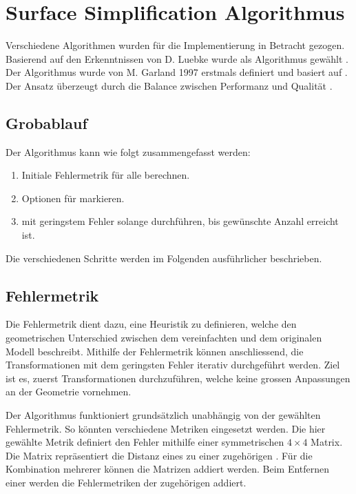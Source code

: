 \section{Surface Simplification Algorithmus}
\label{chap:surfaceSimplificationAlgorithm}
Verschiedene Algorithmen wurden für die Implementierung in Betracht gezogen. Basierend auf den Erkenntnissen von D. Luebke wurde als Algorithmus  gewählt \cite{luebkeAlgorithmComparison}. Der Algorithmus wurde von M. Garland 1997 erstmals definiert und basiert auf . Der Ansatz überzeugt durch die Balance zwischen Performanz und Qualität \cite{surfaceSimplificationUsingQuadricErrorMetrices}\cite{surfaceSimplificationWithColorUsingQuadricErrorMetrices}.

\pagebreak

\subsection{Grobablauf}
Der Algorithmus kann wie folgt zusammengefasst werden:

\begin{enumerate}
  \item Initiale Fehlermetrik für alle  berechnen.
  \item Optionen für  markieren.
  \item {} mit geringstem Fehler solange durchführen, bis gewünschte Anzahl  erreicht ist.
\end{enumerate}

Die verschiedenen Schritte werden im Folgenden ausführlicher beschrieben.

\subsection{Fehlermetrik}
Die Fehlermetrik dient dazu, eine Heuristik zu definieren, welche den geometrischen Unterschied zwischen dem vereinfachten und dem originalen Modell beschreibt. Mithilfe der Fehlermetrik können anschliessend, die Transformationen mit dem geringsten Fehler iterativ durchgeführt werden. Ziel ist es, zuerst Transformationen durchzuführen, welche keine grossen Anpassungen an der Geometrie vornehmen.

Der Algorithmus funktioniert grundsätzlich unabhängig von der gewählten Fehlermetrik. So könnten verschiedene Metriken eingesetzt werden.
Die hier gewählte Metrik definiert den Fehler mithilfe einer symmetrischen $4\times 4$ Matrix. Die Matrix repräsentiert die Distanz eines  zu einer zugehörigen . Für die Kombination mehrerer  können die Matrizen addiert werden. Beim Entfernen einer  werden die Fehlermetriken der zugehörigen  addiert.


